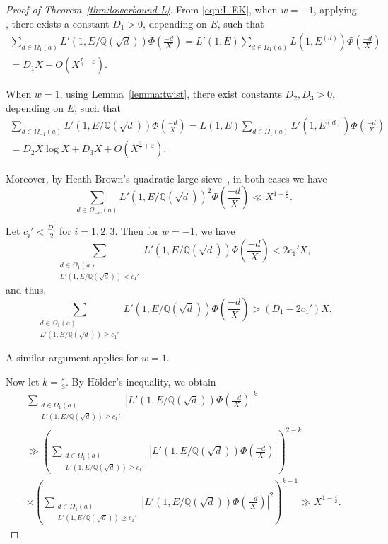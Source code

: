 \documentclass[10pt,a4paper]{amsart}
\begin{document}
\begin{proof}[Proof of Theorem~\ref{thm:lowerbound-L}]
From \eqref{eqn:L'EK}, when \( w = -1 \),
applying \cite[Proposition~2]{RadziwillSoundararajan2015}, there exists a constant \( D_1 > 0 \), depending on \( E \), such that
\begin{multline*}
\sum_{d \in \Omega_{1}(a)}
L'(1, E/\mathbb{Q}(\sqrt{d}))
\Phi\left(\frac{-d}{X}\right)
=
L'(1, E)
\sum_{d \in \Omega_{1}(a)} L(1, E^{(d)})
\Phi\left(\frac{-d}{X}\right)
\\= D_1 X + O\left(X^{\frac{7}{8}+\varepsilon}\right).
\end{multline*}

When \( w = 1 \), using Lemma~\ref{lemma:twist}, there exist constants \( D_2, D_3 > 0 \), depending on \( E \), such that
\begin{multline*}
\sum_{d \in \Omega_{-1}(a)}
L'(1, E/\mathbb{Q}(\sqrt{d}))
\Phi\left(\frac{-d}{X}\right)
=
L(1, E)
\sum_{d \in \Omega_{1}(a)}
L'(1, E^{(d)})
\Phi\left(\frac{-d}{X}\right)
\\= D_2 X \log X + D_3 X + O\left(X^{\frac{3}{4}+\varepsilon}\right).
\end{multline*}

Moreover, by Heath-Brown's quadratic large sieve~\cite{HeathBrown1995}, in both cases we have
\[
\sum_{d \in \Omega_{-w}(a)}
L'(1, E/\mathbb{Q}(\sqrt{d}))^2
\Phi\left(\frac{-d}{X}\right)
\ll X^{1 + \frac{\varepsilon}{2}}.
\]

Let \( c_i'< \frac{D_i}{2} \) for \( i = 1, 2, 3 \). Then for \( w = -1 \), we have
\[
\sum_{\substack{d \in \Omega_1(a) \\ L'(1, E/\mathbb{Q}(\sqrt{d})) < c_1'}}
L'(1, E/\mathbb{Q}(\sqrt{d}))
\Phi\left(\frac{-d}{X}\right)
< 2c_1' X,
\]
and thus,
\[
\sum_{\substack{d \in \Omega_1(a) \\ L'(1, E/\mathbb{Q}(\sqrt{d})) \geq c_1'}}
L'(1, E/\mathbb{Q}(\sqrt{d}))
\Phi\left(\frac{-d}{X}\right)
> (D_1 - 2c_1') X.
\]

A similar argument applies for \( w = 1 \).

Now let \( k = \frac{\varepsilon}{3} \). By H\"older's inequality, we obtain
\begin{multline*}
\sum_{\substack{d \in \Omega_1(a) \\ L'(1, E/\mathbb{Q}(\sqrt{d})) \geq c_1'}}
\left|L'(1, E/\mathbb{Q}(\sqrt{d}))
\Phi\left(\frac{-d}{X}\right)\right|^k
\\ \gg
\left(
\sum_{\substack{d \in \Omega_1(a) \\ L'(1, E/\mathbb{Q}(\sqrt{d})) \geq c_1'}}
\left|L'(1, E/\mathbb{Q}(\sqrt{d}))
\Phi\left(\frac{-d}{X}\right)\right|
\right)^{2 - k}
\\ \times \left(
\sum_{\substack{d \in \Omega_1(a) \\ L'(1, E/\mathbb{Q}(\sqrt{d})) \geq c_1'}}
\left|L'(1, E/\mathbb{Q}(\sqrt{d}))
\Phi\left(\frac{-d}{X}\right)\right|^2
\right)^{k - 1}
\gg X^{1 - \frac{\varepsilon}{2}}.
\end{multline*}


\end{proof}
\end{document}
